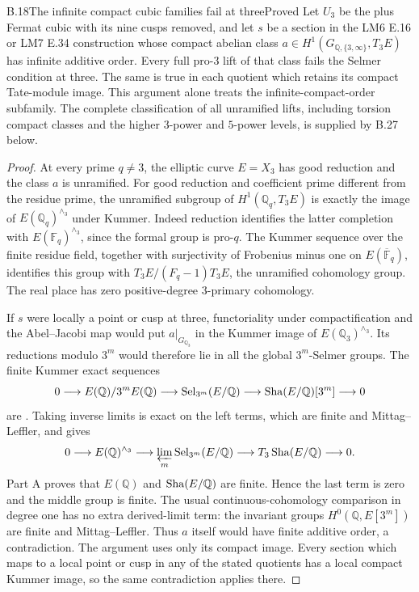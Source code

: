 \begin{statement}{B.18}{The infinite compact cubic families fail at three}{Proved}
Let $U_3$ be the plus Fermat cubic with its nine cusps removed,
and let $s$ be a section in the LM6 E.16 or LM7 E.34
construction whose compact abelian class
$a\in H^1(G_{\mathbb Q,\{3,\infty\}},T_3E)$ has infinite
additive order. Every full pro-$3$ lift of that class fails the
Selmer condition at three. The same is true in each quotient
which retains its compact Tate-module image.
This argument alone treats the infinite-compact-order
subfamily. The complete classification of all unramified
lifts, including torsion compact classes and the higher
$3$-power and $5$-power levels, is supplied by B.27 below.
\end{statement}
\begin{proof}
At every prime $q\ne3$, the elliptic curve $E=X_3$ has good
reduction and the class $a$ is unramified. For good reduction
and coefficient prime different from the residue prime,
the unramified subgroup of $H^1(\mathbb Q_q,T_3E)$ is exactly
the image of $E(\mathbb Q_q)^{\wedge_3}$ under Kummer.
Indeed reduction identifies the latter completion with
$E(\mathbb F_q)^{\wedge_3}$, since the formal group is pro-$q$.
The Kummer sequence over the finite residue field, together
with surjectivity of Frobenius minus one on
$E(\overline{\mathbb F}_q)$, identifies this group with
$T_3E/(F_q-1)T_3E$, the unramified cohomology group.
The real place has zero positive-degree $3$-primary
cohomology.

If $s$ were locally a point or cusp at three, functoriality
under compactification and the Abel--Jacobi map would put
$a|_{G_{\mathbb Q_3}}$ in the Kummer image of
$E(\mathbb Q_3)^{\wedge_3}$. Its reductions modulo $3^m$
would therefore lie in all the global $3^m$-Selmer groups.
The finite Kummer exact sequences
\[
 0\longrightarrow E(\mathbb Q)/3^mE(\mathbb Q)
 \longrightarrow\operatorname{Sel}_{3^m}(E/\mathbb Q)
 \longrightarrow\mathop{\mathrm{Sha}}(E/\mathbb Q)[3^m]\longrightarrow0
\]
are \citet[I, Proposition 6.4]{BMilne2006}. Taking inverse
limits is exact on the left terms, which are finite and
Mittag--Leffler, and gives
\[
 0\longrightarrow E(\mathbb Q)^{\wedge_3}
 \longrightarrow\varprojlim_m\operatorname{Sel}_{3^m}(E/\mathbb Q)
 \longrightarrow T_3\mathop{\mathrm{Sha}}(E/\mathbb Q)\longrightarrow0.
\]
Part A proves that $E(\mathbb Q)$ and $\mathop{\mathrm{Sha}}(E/\mathbb Q)$
are finite. Hence the last term is zero and the middle
group is finite. The usual continuous-cohomology comparison
in degree one has no extra derived-limit term: the invariant
groups $H^0(\mathbb Q,E[3^m])$ are finite and
Mittag--Leffler. Thus $a$ itself would have finite additive
order, a contradiction.
The argument uses only its compact image. Every section
which maps to a local point or cusp in any of the stated
quotients has a local compact Kummer image, so the same
contradiction applies there.
\end{proof}

